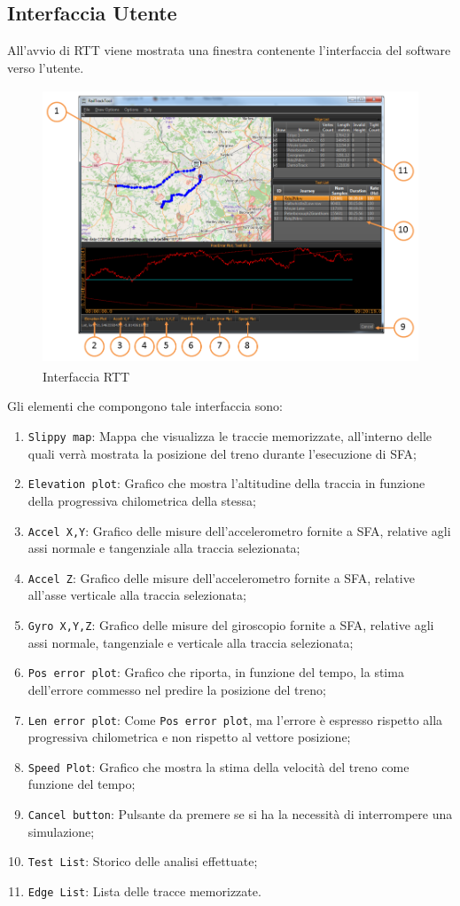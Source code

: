 \subsection{Interfaccia Utente}
All'avvio di RTT viene mostrata una finestra contenente l'interfaccia del software verso l'utente.
\begin{figure}[h]
	\centering
	\includegraphics[height=8.2cm]{img/rtthci}
	\caption{Interfaccia RTT}
	\label{fig:rtt}
\end{figure}\newpage
Gli elementi che compongono tale interfaccia sono:
\begin{enumerate}
\item \texttt{Slippy map}: Mappa che visualizza le traccie memorizzate, all'interno delle quali verr\`a mostrata la posizione del treno durante l'esecuzione di SFA;
\item \texttt{Elevation plot}: Grafico che mostra l'altitudine della traccia in funzione della progressiva chilometrica della stessa;
\item \texttt{Accel X,Y}: Grafico delle misure dell'accelerometro fornite a SFA, relative agli assi normale e tangenziale alla traccia selezionata;
\item \texttt{Accel Z}: Grafico delle misure dell'accelerometro fornite a SFA, relative all'asse verticale alla traccia selezionata; 
\item \texttt{Gyro X,Y,Z}: Grafico delle misure del giroscopio fornite a SFA, relative agli assi normale, tangenziale e verticale alla traccia selezionata;
\item \texttt{Pos error plot}: Grafico che riporta, in funzione del tempo, la stima dell'errore commesso nel predire la posizione del treno;
\item \texttt{Len error plot}: Come \texttt{Pos error plot}, ma l'errore \`e espresso rispetto alla progressiva chilometrica e non rispetto al vettore posizione;
\item \texttt{Speed Plot}: Grafico che mostra la stima della velocit\`a del treno come funzione del tempo;
\item \texttt{Cancel button}: Pulsante da premere se si ha la necessit\`a di interrompere una simulazione;
\item \texttt{Test List}: Storico delle analisi effettuate;
\item \texttt{Edge List}: Lista delle tracce memorizzate.
\end{enumerate}
